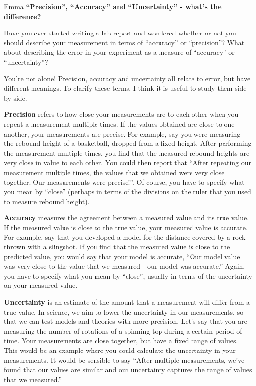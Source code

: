 \begin{studentOpinion}{Emma}
\textbf{``Precision'', ``Accuracy'' and ``Uncertainty'' - what's the difference?}

Have you ever started writing a lab report and wondered whether or not you should describe your measurement in terms of ``accuracy'' or ``precision''? What about describing the error in your experiment as a measure of ``accuracy'' or ``uncertainty''? 

You're not alone! Precision, accuracy and uncertainty all relate to error, but have different meanings. To clarify these terms, I think it is useful to study them side-by-side.

\textbf{Precision} refers to how close your measurements are to each other when you repeat a measurement multiple times. If the values obtained are close to one another, your measurements are precise. For example, say you were measuring the rebound height of a basketball, dropped from a fixed height. After performing the measurement multiple times, you find that the measured rebound heights are very close in value to each other. You could then report that ``After repeating our measurement multiple times, the values that we obtained were very close together. Our measurements were precise!''. Of course, you have to specify what you mean by ``close'' (perhaps in terms of the divisions on the ruler that you used to measure rebound height).

\textbf{Accuracy} measures the agreement between a measured value and its true value. If the measured value is close to the true value, your measured value is accurate. For example, say that you developed a model for the distance covered by a rock thrown with a slingshot. If you find that the measured value is close to the predicted value, you would say that your model is accurate, ``Our model value was very close to the value that we measured - our model was accurate.'' Again, you have to specify what you mean by ``close'', usually in terms of the uncertainty on your measured value.

\textbf{Uncertainty} is an estimate of the amount that a measurement will differ from a true value. In science, we aim to lower the uncertainty in our measurements, so that we can test models and theories with more precision. Let's say that you are measuring the number of rotations of a spinning top during a certain period of time. Your measurements are close together, but have a fixed range of values. This would be an example where you could calculate the uncertainty in your measurements. It would be sensible to say ``After multiple measurements, we've found that our values are similar and our uncertainty captures the range of values that we measured.''

\end{studentOpinion}


